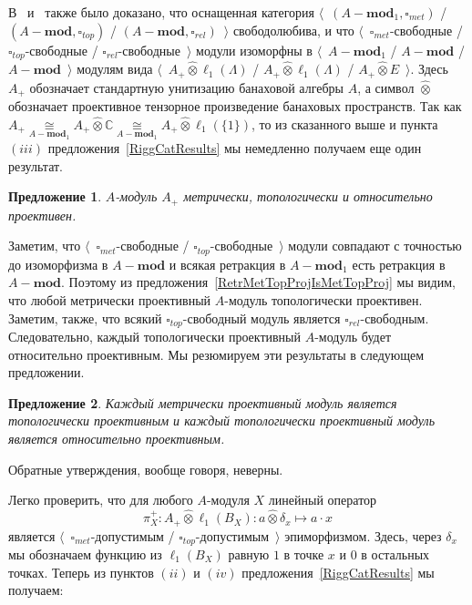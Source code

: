 \documentclass[12pt]{article}
\numberwithin{equation}{subsection}
\theoremstyle{plain}
\newtheorem{proposition}{Предложение}
\newcommand{\projtens}{\mathbin{\widehat{\otimes}}}
\newcommand{\isom}[1]{\mathop{\mathbin{\cong}}\limits_{#1}}
\begin{document}
\begin{fulltext}
В~\cite{HelMetrFrQMod} и~\cite{ShtTopFrClassicQuantMod} также было доказано, что
оснащенная категория $\langle$~$(A-\mathbf{mod}_1,\square_{met})$ /
$(A-\mathbf{mod},\square_{top})$ / $(A-\mathbf{mod},\square_{rel})$~$\rangle$
свободолюбива, и что $\langle$~$\square_{met}$-свободные /
$\square_{top}$-свободные / $\square_{rel}$-свободные~$\rangle$ модули изоморфны
в $\langle$~$A-\mathbf{mod}_1$ / $A-\mathbf{mod}$ / $A-\mathbf{mod}$~$\rangle$
модулям вида $\langle$~$A_+\projtens \ell_1(\Lambda)$ / $A_+\projtens
\ell_1(\Lambda)$ / $A_+\projtens E$~$\rangle$. Здесь $A_+$ обозначает
стандартную унитизацию банаховой алгебры $A$, а символ $\projtens$ обозначает
проективное тензорное произведение банаховых пространств. Так как
$A_+\isom{A-\mathbf{mod}_1}A_+\projtens\mathbb{C}
\isom{A-\mathbf{mod}_1}A_+\projtens\ell_1( \{1 \})$,
то из сказанного выше и пункта $(iii)$ предложения~\ref{RiggCatResults} мы
немедленно получаем еще один результат.

\begin{proposition}\label{UnitalAlgIsMetTopProj} $A$-модуль $A_+$ метрически,
топологически и  относительно проективен.
\end{proposition} 

Заметим, что $\langle$~$\square_{met}$-свободные /
$\square_{top}$-свободные~$\rangle$ модули совпадают с точностью до изоморфизма
в $A-\mathbf{mod}$ и всякая ретракция в $A-\mathbf{mod}_1$ есть ретракция в
$A-\mathbf{mod}$. Поэтому из предложения~\ref{RetrMetTopProjIsMetTopProj} мы
видим, что любой метрически проективный $A$-модуль топологически проективен.
Заметим, также, что всякий $\square_{top}$-свободный модуль является
$\square_{rel}$-свободным. Следовательно, каждый топологически проективный
$A$-модуль будет относительно проективным. Мы резюмируем эти результаты в
следующем предложении.

\begin{proposition}\label{MetProjIsTopProjAndTopProjIsRelProj} Каждый метрически
проективный модуль является топологически проективным и каждый топологически
проективный модуль является относительно проективным.
\end{proposition}

Обратные утверждения, вообще говоря, неверны.


Легко проверить, что для любого $A$-модуля $X$ линейный оператор
$$
\pi_X^+:A_+\projtens \ell_1(B_X):a\projtens \delta_x\mapsto a\cdot x
$$
является $\langle$~$\square_{met}$-допустимым /
$\square_{top}$-допустимым~$\rangle$ эпиморфизмом. Здесь, через $\delta_x$ мы
обозначаем функцию из $\ell_1(B_X)$ равную $1$ в точке $x$ и $0$ в остальных
точках. Теперь из пунктов $(ii)$ и $(iv)$ предложения~\ref{RiggCatResults} мы
получаем:


\end{fulltext}
\end{document}
